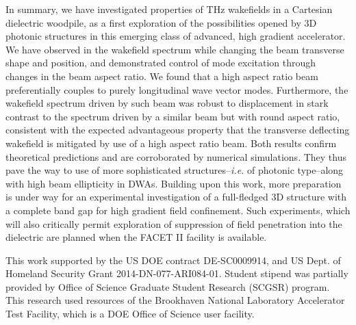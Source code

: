 \documentclass{article}
\begin{document}
In summary, we have investigated properties of THz wakefields in a Cartesian dielectric woodpile, as a first exploration of the possibilities opened by 3D photonic structures in this emerging class of advanced, high gradient accelerator. We have observed in the wakefield spectrum while changing the beam transverse shape and position, and demonstrated control of mode excitation through changes in the beam aspect ratio. We found that a high aspect ratio beam preferentially couples to purely longitudinal wave vector modes. Furthermore, the wakefield spectrum driven by such beam was robust to displacement in stark contrast to the spectrum driven by a similar beam but with round aspect ratio, consistent with the expected advantageous property that the transverse deflecting wakefield is mitigated by use of a high aspect ratio beam. Both results confirm theoretical predictions and are corroborated by numerical simulations. They thus pave the way to use of more sophisticated structures--\textit{i.e.} of photonic type--along with high beam ellipticity in DWAs. Building upon this work, more preparation is under way for an experimental investigation of a full-fledged 3D structure with a complete band gap for high gradient field confinement. Such experiments, which will also critically permit exploration of suppression of field penetration into the dielectric are planned when the FACET II \cite{phinney2016} facility is available.



This work supported by the US DOE contract DE-SC0009914, and US Dept. of Homeland Security Grant 2014-DN-077-ARI084-01. Student stipend was partially provided by Office of Science Graduate Student Research (SCGSR) program. This research used resources of the Brookhaven National Laboratory Accelerator Test Facility, which is a DOE Office of Science user facility.




\end{document}
